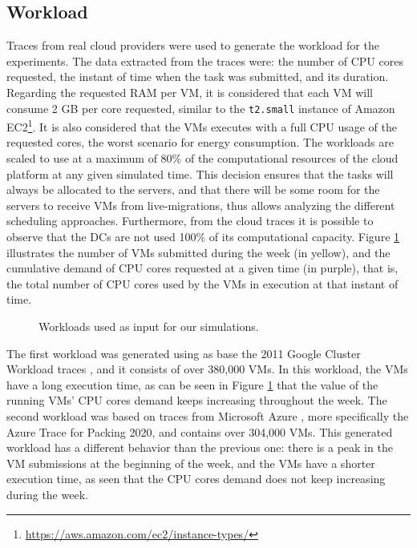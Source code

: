 \subsection{Workload}

Traces from real cloud providers were used to generate the workload for the experiments. The data extracted from the traces were: the number of CPU cores requested, the instant of time when the task was submitted, and its duration. Regarding the requested RAM per VM,
it is considered that each VM will consume 2 GB per core requested, similar to the \texttt{t2.small} instance of Amazon EC2\footnote{\url{https://aws.amazon.com/ec2/instance-types/}}. It is also considered that the VMs executes with a full CPU usage of the requested cores, the worst scenario for energy consumption.  The workloads are scaled to use at a maximum of 80\% of the computational resources of the cloud platform at any given simulated time. This decision ensures that the tasks will always be allocated to the servers, and that there will be some room for the servers to receive VMs from live-migrations, thus allows analyzing the different scheduling approaches. Furthermore, from the cloud traces it is possible to observe that the DCs are not used 100\% of its computational capacity. Figure \ref{fig:workload} illustrates the number of VMs submitted during the week (in yellow), and the cumulative demand of CPU cores requested at a given time (in purple), that is, the total number of CPU cores used by the VMs in execution at that instant of time. 

\begin{figure}[!htbp]
  \centering
   {}
  \caption{Workloads used as input for our simulations.}
  \label{fig:workload}
 \end{figure}

The first workload was generated using as base the 2011 Google Cluster Workload traces \cite{google2011traces}, and it consists of over 380,000 VMs. In this workload, the VMs have a long execution time, as can be seen in Figure \ref{fig:workload} that the value of the running VMs' CPU cores demand keeps increasing throughout the week. The second workload was based on traces from Microsoft Azure \cite{hadary2020protean}, more specifically the Azure Trace for Packing 2020, and contains over 304,000 VMs. This generated workload has a different behavior than the previous one: there is a peak in the VM submissions at the beginning of the week, and the VMs have a shorter execution time, as seen that the CPU cores demand does not keep increasing during the week.

